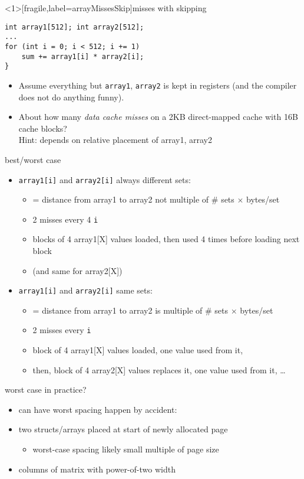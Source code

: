 \begin{frame}<1>[fragile,label=arrayMissesSkip]{misses with skipping}
\begin{lstlisting}
int array1[512]; int array2[512];
...
for (int i = 0; i < 512; i += 1)
    sum += array1[i] * array2[i];
}
\end{lstlisting}
    \begin{itemize}
        \item {\small
    Assume everything but {\tt array1}, {\tt array2} is kept in registers (and the compiler does not do
    anything funny).
        }
    \item
About how many \textit{data cache misses} on a 2KB direct-mapped cache with 16B cache blocks? \\
Hint: depends on relative placement of array1, array2
\end{itemize}
\end{frame}

\begin{frame}{best/worst case}
\begin{itemize}
\item \texttt{array1[i]} and \texttt{array2[i]} always different sets:
    \begin{itemize}
    \item = distance from array1 to array2 not multiple of \# sets $\times$ bytes/set
    \item 2 misses every 4 \texttt{i}
    \item blocks of 4 array1[X] values loaded, then used 4 times before loading next block
    \item (and same for array2[X])
    \end{itemize}
\item \texttt{array1[i]} and \texttt{array2[i]} same sets:
    \begin{itemize}
    \item = distance from array1 to array2 is multiple of \# sets $\times$ bytes/set
    \item 2 misses every \texttt{i}
    \item block of 4 array1[X] values loaded, one value used from it,
    \item then, block of 4 array2[X] values replaces it, one value used from it, \ldots
    \end{itemize}
\end{itemize}
\end{frame}

\begin{frame}{worst case in practice?}
    \begin{itemize}
    \item can have worst spacing happen by accident:
    \vspace{.5cm}
    \item two structs/arrays placed at start of newly allocated page
        \begin{itemize}
        \item worst-case spacing likely small multiple of page size
        \end{itemize}
    \item columns of matrix with power-of-two width
    \end{itemize}
\end{frame}
